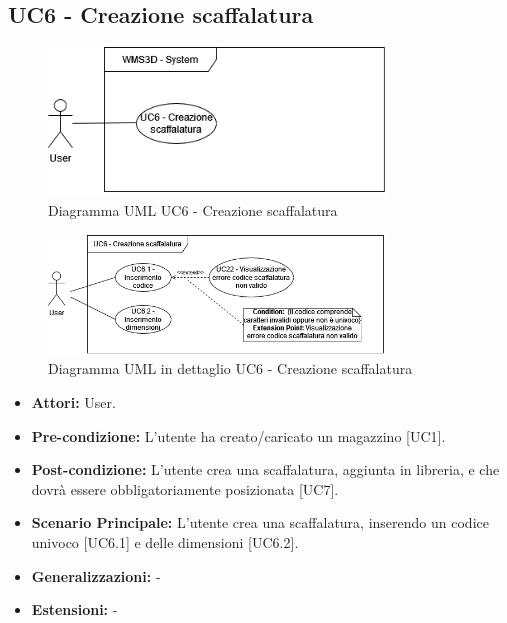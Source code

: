 \subsection{UC6 - Creazione scaffalatura}
\begin{figure}[H]
  \centering
  \includegraphics[width=0.8\textwidth]{UC_diagrams_1-10/UC6_sys.drawio.png}
   \caption{Diagramma UML UC6 - Creazione scaffalatura}
\end{figure}
\begin{figure}[H]
  \centering
  \includegraphics[width=0.8\textwidth]{UC_diagrams_1-10/UC6.drawio.png}
   \caption{Diagramma UML in dettaglio UC6 - Creazione scaffalatura}
\end{figure}
\begin{itemize}
    \item \textbf{Attori:} User.
    \item \textbf{Pre-condizione:}  L'utente ha creato/caricato un magazzino [UC1].
    \item \textbf{Post-condizione:} L'utente crea una scaffalatura, aggiunta in libreria, e che dovrà essere obbligatoriamente posizionata [UC7].
    \item \textbf{Scenario Principale:}  L'utente crea una scaffalatura, inserendo un codice univoco [UC6.1] e delle dimensioni [UC6.2].
    \item \textbf{Generalizzazioni:} -
    \item \textbf{Estensioni:} -
\end{itemize}


